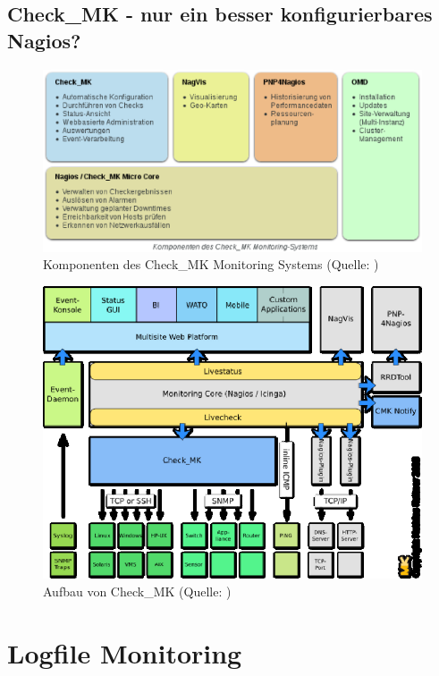 \documentclass[12pt,a4paper,parskip]{scrreprt}
\begin{document}
	\subsection{Check\_MK - nur ein besser konfigurierbares Nagios?}
	\begin{figure}[!h]
		\centering
		\includegraphics[width=1\textwidth]{pics/checkMKAufbau.eps}
		\caption[Komponenten des Check\_MK Monitoring Systems]{Komponenten des Check\_MK Monitoring Systems (Quelle: \cite{checkmkmonitoringpic})}
	\end{figure}
	\begin{figure}[!h]
		\centering
		\includegraphics[width=1\textwidth]{pics/OMD_Schema.eps}
		\caption[Aufbau von Check\_MK]{Aufbau von Check\_MK (Quelle: \cite{checkmk})}
	\end{figure}
	\clearpage
	
	\section{Logfile Monitoring}
\end{document}
